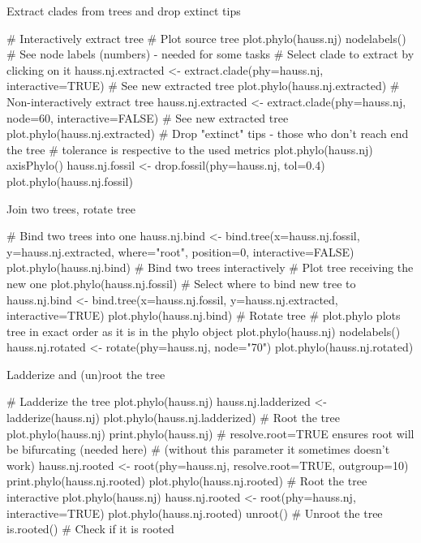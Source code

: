 \documentclass[compress, ucs, xelatex, 11pt, xcolor=svgnames,
	hyperref={
		bookmarks=true,
		unicode=true,
		colorlinks=true,
		pdftitle={Molecular data in R},
		plainpages=false,
		pdfauthor={Vojtech Zeisek},
		pdfsubject={Course about phylogeny and evolution in R},
		pdfcreator={XeLaTeX},
		pdfkeywords={R, evolution, phylogeny, molecular data},
		linkcolor=Tomato,
		anchorcolor=SaddleBrown,
		citecolor=Goldenrod,
		filecolor=DarkMagenta,
		menucolor=Sienna,
		urlcolor=DarkTurquoise,
		pdftex},
	url={hyphens, lowtilde} %
	]{beamer}
\begin{document}
\begin{frame}[fragile]{Extract clades from trees and drop extinct tips}
	\begin{spluscode}
    # Interactively extract tree
    # Plot source tree
    plot.phylo(hauss.nj)
    nodelabels() # See node labels (numbers) - needed for some tasks
    # Select clade to extract by clicking on it
    hauss.nj.extracted <- extract.clade(phy=hauss.nj, interactive=TRUE)
    # See new extracted tree
    plot.phylo(hauss.nj.extracted)
    # Non-interactively extract tree
    hauss.nj.extracted <- extract.clade(phy=hauss.nj, node=60,
      interactive=FALSE)
    # See new extracted tree
    plot.phylo(hauss.nj.extracted)
    # Drop "extinct" tips - those who don't reach end the tree
    # tolerance is respective to the used metrics
    plot.phylo(hauss.nj)
    axisPhylo()
    hauss.nj.fossil <- drop.fossil(phy=hauss.nj, tol=0.4)
    plot.phylo(hauss.nj.fossil)
	\end{spluscode}
\end{frame}

\begin{frame}[fragile]{Join two trees, rotate tree}
	\begin{spluscode}
    # Bind two trees into one
    hauss.nj.bind <- bind.tree(x=hauss.nj.fossil, y=hauss.nj.extracted,
      where="root", position=0, interactive=FALSE)
    plot.phylo(hauss.nj.bind)
    # Bind two trees interactively
    # Plot tree receiving the new one
    plot.phylo(hauss.nj.fossil)
    # Select where to bind new tree to
    hauss.nj.bind <- bind.tree(x=hauss.nj.fossil, y=hauss.nj.extracted,
      interactive=TRUE)
    plot.phylo(hauss.nj.bind)
    # Rotate tree
    # plot.phylo plots tree in exact order as it is in the phylo object
    plot.phylo(hauss.nj)
    nodelabels()
    hauss.nj.rotated <- rotate(phy=hauss.nj, node="70")
    plot.phylo(hauss.nj.rotated)
	\end{spluscode}
\end{frame}

\begin{frame}[fragile]{Ladderize and (un)root the tree}
	\begin{spluscode}
    # Ladderize the tree
    plot.phylo(hauss.nj)
    hauss.nj.ladderized <- ladderize(hauss.nj)
    plot.phylo(hauss.nj.ladderized)
    # Root the tree
    plot.phylo(hauss.nj)
    print.phylo(hauss.nj)
    # resolve.root=TRUE ensures root will be bifurcating (needed here)
    # (without this parameter it sometimes doesn't work)
    hauss.nj.rooted <- root(phy=hauss.nj, resolve.root=TRUE, outgroup=10)
    print.phylo(hauss.nj.rooted)
    plot.phylo(hauss.nj.rooted)
    # Root the tree interactive
    plot.phylo(hauss.nj)
    hauss.nj.rooted <- root(phy=hauss.nj, interactive=TRUE)
    plot.phylo(hauss.nj.rooted)
    unroot() # Unroot the tree
    is.rooted() # Check if it is rooted
	\end{spluscode}
\end{frame}
\end{document}
